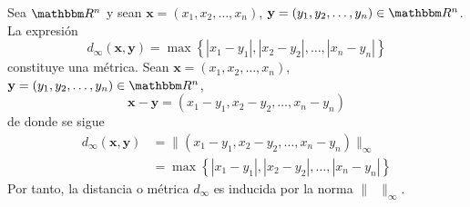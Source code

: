 \begin{examplebox}{}{}
    Sea $\RR[n]$ y sean $\mathbf{x} = (x_1, x_2, \dots, x_n)$, $\mathbf{y} = (y_1, y_2, \dots, y_n) \in \RR[n]$. La expresión
    $$d_{\infty}( \mathbf{x}, \mathbf{y} ) = \max \left\{ |x_1 - y_1|, |x_2 - y_2|, \dots, |x_n - y_n| \right\}$$
    constituye una métrica. Sean $\mathbf{x} = (x_1, x_2, \dots, x_n)$, $\mathbf{y} = (y_1, y_2, \dots, y_n) \in \RR[n]$,
    $$\mathbf{x} - \mathbf{y} = (x_1 - y_1, x_2 - y_2, \dots, x_n - y_n)$$
    de donde se sigue
    \begin{align*}
        d_{\infty}( \mathbf{x}, \mathbf{y} ) & = \| (x_1 - y_1, x_2 - y_2, \dots, x_n - y_n) \|_{\infty} \\
        & = \max \left\{ |x_1 - y_1|, |x_2 - y_2|, \dots, |x_n - y_n| \right\}
    \end{align*}
    Por tanto, la distancia o métrica $d_{\infty}$ es inducida por la norma $\| \phantom{x} \|_{\infty}$.
\end{examplebox}

